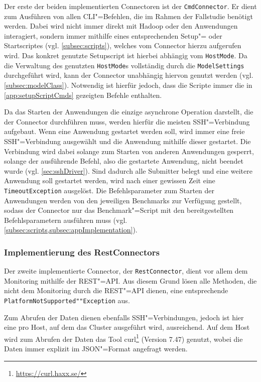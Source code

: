 Der erste der beiden implementierten Connectoren ist der \texttt{CmdConnector}.
Er dient zum Ausführen von allen CLI"=Befehlen, die im Rahmen der Fallstudie benötigt werden.
Dabei wird nicht immer direkt mit Hadoop oder den Anwendungen interagiert, sondern immer mithilfe eines entsprechenden Setup"= oder Startscriptes (vgl. \cref{subsec:scripts}), welches vom Connector hierzu aufgerufen wird.
Das konkret genutzte Setupscript ist hierbei abhängig vom \texttt{HostMode}.
Da die Verwaltung des genutzten \texttt{HostMode}s vollständig durch die \texttt{ModelSettings} durchgeführt wird, kann der Connector unabhängig hiervon genutzt werden (vgl. \cref{subsec:modelClass}).
Notwendig ist hierfür jedoch, dass die Scripte immer die in \cref{app:setupScriptCmds} gezeigten Befehle enthalten.

Da das Starten der Anwendungen die einzige asynchrone Operation darstellt, die der Connector durchführen muss, werden hierfür die meisten SSH"=Verbindung aufgebaut.
Wenn eine Anwendung gestartet werden soll, wird immer eine freie SSH"=Verbindung ausgewählt und die Anwendung mithilfe dieser gestartet.
Die Verbindung wird dabei solange zum Starten von anderen Anwendungen gesperrt, solange der ausführende Befehl, also die gestartete Anwendung, nicht beendet wurde (vgl. \cref{sec:sshDriver}).
Sind dadurch alle Submitter belegt und eine weitere Anwendung soll gestartet werden, wird nach einer gewissen Zeit eine \texttt{TimeoutException} ausgelöst.
Die Befehlsparameter zum Starten der Anwendungen werden von den jeweiligen Benchmarks zur Verfügung gestellt, sodass der Connector nur das Benchmark"=Script mit den bereitgestellten Befehlsparametern ausführen muss (vgl. \cref{subsec:scripts,subsec:appImplementation}).

\subsubsection{Implementierung des RestConnectors}
\label{subsubsec:implRestConnector}

Der zweite implementierte Connector, der \texttt{RestConnector}, dient vor allem dem Monitoring mithilfe der REST"=API.
Aus diesem Grund lösen alle Methoden, die nicht dem Monitoring durch die REST"=API dienen, eine entsprechende \texttt{PlatformNotSupported""Exception} aus.

Zum Abrufen der Daten dienen ebenfalls SSH"=Verbindungen, jedoch ist hier eine pro Host, auf dem das Cluster ausgeführt wird, ausreichend.
Auf dem Host wird zum Abrufen der Daten das Tool curl\footnote{\url{https://curl.haxx.se/}} (Version 7.47) genutzt, wobei die Daten immer explizit im JSON"=Format angefragt werden.

